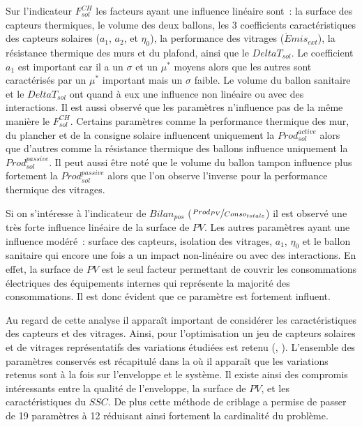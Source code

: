 Sur l’indicateur $F_{sol}^{CH}$ les facteurs ayant une influence linéaire sont~: la
surface des capteurs thermiques, le volume des deux ballons, les \num{3} coefficients
caractéristiques des capteurs solaires ($a_{1}$, $a_{2}$, et $\eta_{0}$), la performance
des vitrages ($\acute Emis_{ext}$), la résistance thermique des murs et du plafond, ainsi que le
$DeltaT_{sol}$. Le coefficient $a_{1}$ est important car il a un $\sigma$ et un $\mu^{*}$
moyens alors que les autres sont caractérisés par un $\mu^{*}$ important mais un $\sigma$
faible. Le volume du ballon sanitaire et le $DeltaT_{sol}$ ont quand à eux une influence
non linéaire ou avec des interactions.
Il est aussi observé que les paramètres n’influence pas de la même manière le $F_{sol}^{CH}$.
Certains paramètres comme la performance thermique des mur, du plancher et de la consigne solaire
influencent uniquement la $Prod_{sol}^{active}$ alors que
d’autres comme la résistance thermique des ballons influence uniquement la $Prod_{sol}^{passive}$.
Il peut aussi être noté que le volume du ballon tampon influence plus fortement la
$Prod_{sol}^{passive}$ alors que l’on observe l’inverse pour la performance thermique
des vitrages.


Si on s’intéresse à l’indicateur de $Bilan_{pos}$ ($\nicefrac{Prod_{PV}}{Conso_{totale}}$)
il est observé une très forte influence linéaire de la surface de $PV$. Les autres paramètres
ayant une influence modéré~: surface des capteurs, isolation des vitrages, $a_{1}$, $\eta_{0}$
et le ballon sanitaire qui encore une fois a un impact non-linéaire ou avec des interactions.
En effet, la surface de $PV$ est le seul facteur permettant de couvrir les consommations
électriques des équipements internes qui représente la majorité des consommations. Il est donc
évident que ce paramètre est fortement influent.


Au regard de cette analyse il apparaît important de considérer les caractéristiques des capteurs et
des vitrages. Ainsi, pour l’optimisation un jeu de capteurs solaires et de vitrages représentatifs
des variations étudiées est retenu (, ).
L’ensemble des paramètres conservés est récapitulé dans la  où il
apparaît que les variations retenus sont à la fois sur l’enveloppe et le système.
Il existe ainsi des compromis intéressants entre la qualité de l’enveloppe, la surface de $PV$, et
les caractéristiques du $SSC$. De plus cette méthode de criblage a permise de passer de
\num{19} paramètres à \num{12} réduisant ainsi fortement la cardinalité du problème.





